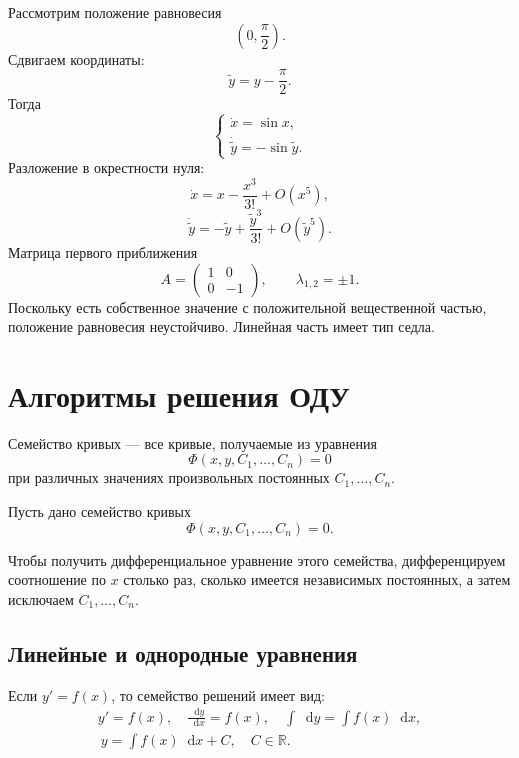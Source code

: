\documentclass[12pt,a4paper]{article}
\numberwithin{equation}{section}
\newcommand{\dd}{\mathop{}\!\mathrm{d}}
\begin{document}
\begin{exampleHSE}[Система $\dot x=\sin x$, $\dot y=\cos y$]
Рассмотрим положение равновесия
\[
\left(0,\frac{\pi}{2}\right).
\]
Сдвигаем координаты:
\[
\widetilde y=y-\frac{\pi}{2}.
\]
Тогда
\[
\begin{cases}
\dot x=\sin x,\\
\dot{\widetilde y}=-\sin\widetilde y.
\end{cases}
\]
Разложение в окрестности нуля:
\[
\dot x=x-\frac{x^3}{3!}+O(x^5),
\]
\[
\dot{\widetilde y}
=-\widetilde y+\frac{\widetilde y^3}{3!}+O(\widetilde y^5).
\]
Матрица первого приближения
\[
A=\begin{pmatrix}1&0\\0&-1\end{pmatrix},
\qquad \lambda_{1,2}=\pm1.
\]
Поскольку есть собственное значение с положительной вещественной частью, положение равновесия неустойчиво. Линейная часть имеет тип седла.
\end{exampleHSE}

\section{Алгоритмы решения ОДУ}

\begin{definitionHSE}
Семейство кривых --- все кривые, получаемые из уравнения
\[\Phi(x,y,C_1,\ldots,C_n)=0\]
при различных значениях произвольных постоянных \(C_1,\ldots,C_n\).
\end{definitionHSE}

Пусть дано семейство кривых
\[\Phi(x, y, C_1,\ldots, C_n) = 0.\]

Чтобы получить дифференциальное уравнение этого семейства, дифференцируем соотношение по \(x\) столько раз, сколько имеется независимых постоянных, а затем исключаем \(C_1,\ldots,C_n\).

\subsection{Линейные и однородные уравнения}

\label{box:type0}
\begin{definitionHSE}
Если \(y' = f(x)\), то семейство решений имеет вид:
\begin{gather*}
y'=f(x),\quad\frac{\dd y}{\dd x}=f(x),\quad\int\dd y = \int f(x)\dd x,\\
\boxed{\ y = \int f(x)\dd x + C, \quad C \in \mathbb{R}.\ }
\end{gather*}
\end{definitionHSE}
\end{document}
